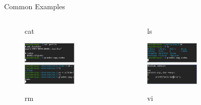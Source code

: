 \documentclass{beamer}
\begin{document}
\begin{frame}{Common Examples}
	\begin{columns}
		\begin{column}{0.33\textwidth}
			\begin{figure}
				\centering
				\caption{cat}
				\includegraphics[width=0.7\textwidth]{cat.png}
				\includegraphics[width=0.7\textwidth]{rm.png}
				\caption{rm}
			\end{figure}
		\end{column}
		\begin{column}{0.33\textwidth}
			\begin{figure}
				\centering
				\caption{ls}
				\includegraphics[width=0.7\textwidth]{ls.png}
				\includegraphics[width=0.7\textwidth]{vi.png}
				\caption{vi}
			\end{figure}
		\end{column}
		\begin{column}{0.33\textwidth}
			\begin{figure}
				\centering

\end{figure}
\end{column}
\end{columns}
\end{frame}
\end{document}
